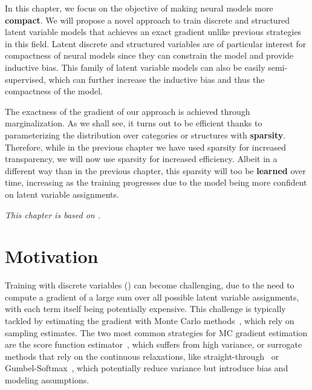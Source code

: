 \label{chap:sparsemarg}

\cleardoublepage
{}

In this chapter, we focus on the objective of making neural models
more \textbf{compact}. We will propose a novel approach to train
discrete and structured latent variable models that achieves an exact
gradient unlike previous strategies in this field. Latent discrete
and structured variables are of particular interest for compactness
of neural models since they can constrain the model and provide
inductive bias. This family of latent variable models can also be easily
semi-supervised, which can further increase the inductive bias and
thus the compactness of the model.

The exactness of the gradient of our approach is achieved through
marginalization. As we shall see, it turns out to be efficient thanks
to parameterizing the distribution over categories or structures with
\textbf{sparsity}. Therefore, while in the previous chapter we have
used sparsity for increased transparency, we will now use sparsity
for increased efficiency. Albeit in a different way than in the
previous chapter, this sparsity will too be \textbf{learned} over
time, increasing as the training progresses due to the model being
more confident on latent variable assignments.

\textit{This chapter is based on \citet{correia2020procneurips}.}

\section{Motivation}
\label{sec:intro}

Training with discrete variables () can
become challenging, due to the need to compute a gradient of a large
sum over all possible latent variable assignments, with each term
itself being potentially expensive. This challenge is typically
tackled by estimating the gradient with Monte Carlo
methods~\citep[MC;][]{mohamed2019monte}, which rely on sampling
estimates. The two most common strategies for MC gradient estimation
are the score function
estimator~\citep[SFE;][]{rubinstein1976monte,paisley2012variational},
which suffers from high variance, or surrogate methods that rely on
the continuous relaxations, like straight-through~\citep{STE} or
Gumbel-Softmax~\citep{Concrete,GumbelSoftmax}, which potentially
reduce variance but introduce bias and modeling assumptions.

